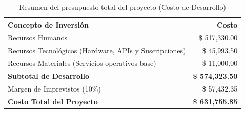 \begin{table}[H]
    \centering
    \caption{Resumen del presupuesto total del proyecto (Costo de Desarrollo)}
    \label{tab:flujo_pago}
    \begin{tabular}{|p{}|r|}
        \hline
        \textbf{Concepto de Inversión} & \textbf{Costo} \\ \hline
        Recursos Humanos  & \$ 517,330.00 \\ \hline
        Recursos Tecnológicos (Hardware, APIs y Suscripciones) & \$ 45,993.50 \\ \hline
        Recursos Materiales (Servicios operativos base) & \$ 11,000.00 \\ \hline
        \textbf{Subtotal de Desarrollo} & \textbf{\$ 574,323.50} \\ \hline
        Margen de Imprevistos (10\%) & \$ 57,432.35 \\ \hline
        \textbf{Costo Total del Proyecto} & \textbf{\$ 631,755.85} \\ \hline
    \end{tabular}
\end{table}